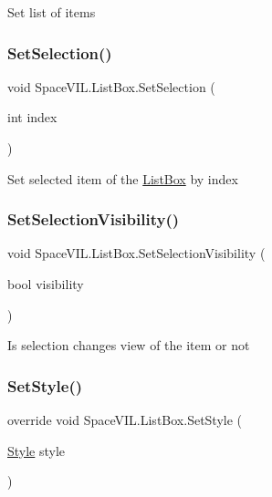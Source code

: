 Set list of items 

\mbox{\label{class_space_v_i_l_1_1_list_box_a8a669fef109cdf5987cdb97af858d3fb}} 
\subsubsection{\texorpdfstring{Set\+Selection()}{SetSelection()}}
{\footnotesize\ttfamily void Space\+V\+I\+L.\+List\+Box.\+Set\+Selection (\begin{DoxyParamCaption}\item[{int}]{index }\end{DoxyParamCaption})}



Set selected item of the \mbox{\hyperlink{class_space_v_i_l_1_1_list_box}{List\+Box}} by index 

\mbox{\label{class_space_v_i_l_1_1_list_box_af01fa2d7d867b5da7847844f64405cad}} 
\subsubsection{\texorpdfstring{Set\+Selection\+Visibility()}{SetSelectionVisibility()}}
{\footnotesize\ttfamily void Space\+V\+I\+L.\+List\+Box.\+Set\+Selection\+Visibility (\begin{DoxyParamCaption}\item[{bool}]{visibility }\end{DoxyParamCaption})}



Is selection changes view of the item or not 

\mbox{\label{class_space_v_i_l_1_1_list_box_aee5cd595b70e4ca4dff5022c662373d9}} 
\subsubsection{\texorpdfstring{Set\+Style()}{SetStyle()}}
{\footnotesize\ttfamily override void Space\+V\+I\+L.\+List\+Box.\+Set\+Style (\begin{DoxyParamCaption}\item[{\mbox{\hyperlink{class_space_v_i_l_1_1_decorations_1_1_style}{Style}}}]{style }\end{DoxyParamCaption})\hspace{0.3cm}{\ttfamily [virtual]}}



